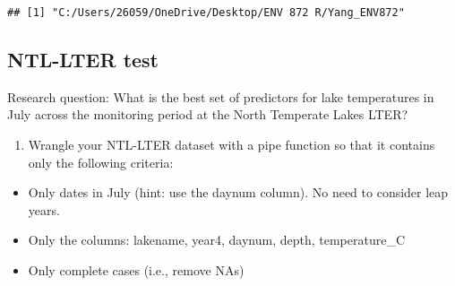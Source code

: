 \documentclass[]{article}
\newenvironment{Shaded}{\begin{snugshade}}{\end{snugshade}}
\newcommand{\CommentTok}[1]{\textcolor[rgb]{0.56,0.35,0.01}{\textit{#1}}}
\newcommand{\DataTypeTok}[1]{\textcolor[rgb]{0.13,0.29,0.53}{#1}}
\newcommand{\DecValTok}[1]{\textcolor[rgb]{0.00,0.00,0.81}{#1}}
\newcommand{\KeywordTok}[1]{\textcolor[rgb]{0.13,0.29,0.53}{\textbf{#1}}}
\newcommand{\NormalTok}[1]{#1}
\newcommand{\OperatorTok}[1]{\textcolor[rgb]{0.81,0.36,0.00}{\textbf{#1}}}
\newcommand{\StringTok}[1]{\textcolor[rgb]{0.31,0.60,0.02}{#1}}
\providecommand{\tightlist}{%
  \setlength{\itemsep}{0pt}\setlength{\parskip}{0pt}}
\begin{document}
\begin{Shaded}
\end{Shaded}

\begin{verbatim}
## [1] "C:/Users/26059/OneDrive/Desktop/ENV 872 R/Yang_ENV872"
\end{verbatim}

\begin{Shaded}
\end{Shaded}

\hypertarget{ntl-lter-test}{%
\subsection{NTL-LTER test}\label{ntl-lter-test}}

Research question: What is the best set of predictors for lake
temperatures in July across the monitoring period at the North Temperate
Lakes LTER?

\begin{enumerate}
\def\labelenumi{\arabic{enumi}.}
\setcounter{enumi}{2}
\tightlist
\item
  Wrangle your NTL-LTER dataset with a pipe function so that it contains
  only the following criteria:
\end{enumerate}

\begin{itemize}
\tightlist
\item
  Only dates in July (hint: use the daynum column). No need to consider
  leap years.
\item
  Only the columns: lakename, year4, daynum, depth, temperature\_C
\item
  Only complete cases (i.e., remove NAs)
\end{itemize}
\end{document}

